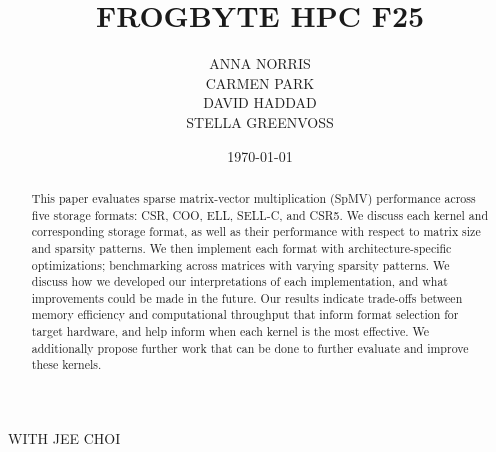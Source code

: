 \documentclass{article}
\title{FROGBYTE HPC F25}
\author{ANNA NORRIS\\CARMEN PARK\\DAVID HADDAD\\STELLA GREENVOSS}
\date{\today}
\begin{document}
\maketitle


\begin{center}
WITH JEE CHOI\\[100pt]
\end{center}

\begin{abstract}
This paper evaluates sparse matrix-vector multiplication (SpMV) performance across five storage formats: CSR, COO, ELL, SELL-C, and CSR5. We discuss each kernel and corresponding storage format, as well as their performance with respect to matrix size and sparsity patterns. We then implement each format with architecture-specific optimizations; benchmarking across matrices with varying sparsity patterns. We discuss how we developed our interpretations of each implementation, and what improvements could be made in the future. Our results indicate trade-offs between memory efficiency and computational throughput that inform format selection for target hardware, and help inform when each kernel is the most effective. We additionally propose further work that can be done to further evaluate and improve these kernels.\\[60pt]
\end{abstract}
\end{document}
